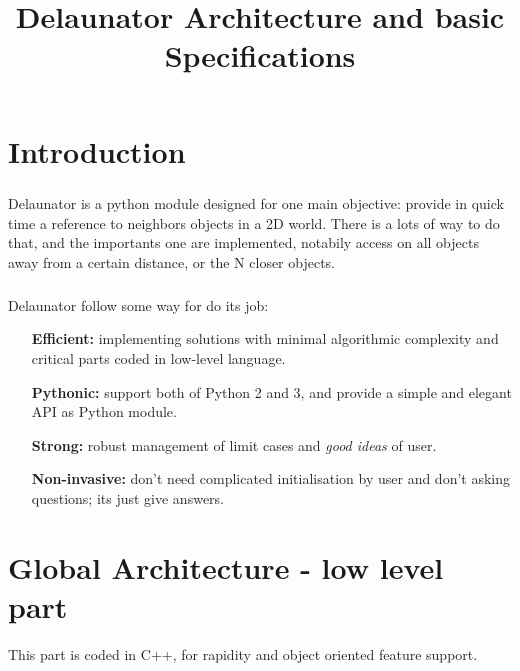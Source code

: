 \documentclass{report}
\title{Delaunator Architecture and basic Specifications}
\author{}
\date{}
\begin{document}
        \maketitle




\chapter{Introduction}
    \paragraph*{}
    Delaunator is a python module designed for one main objective: provide in quick time a reference to neighbors objects in a 2D world.
    There is a lots of way to do that, and the importants one are implemented, notabily access on all objects away from a certain distance, 
    or the N closer objects.

    \paragraph*{}
    Delaunator follow some way for do its job:
    \begin{enumerate}
        \item[\textbf{Efficient:}] implementing solutions with minimal algorithmic complexity and critical parts coded in low-level language.
        \item[\textbf{Pythonic:}] support both of Python 2 and 3, and provide a simple and elegant API as Python module.
        \item[\textbf{Strong:}] robust management of limit cases and \textit{good ideas} of user.
        \item[\textbf{Non-invasive:}] don't need complicated initialisation by user and don't asking questions; its just give answers.
    \end{enumerate}
    \newpage
    



\chapter{Global Architecture - low level part}
This part is coded in C++, for rapidity and object oriented feature support.
\end{document}
